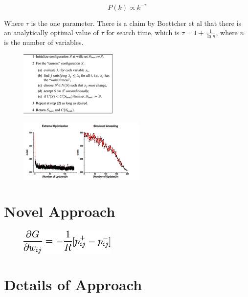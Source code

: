 \documentclass[12pt]{article}
\begin{document}
$$P(k) \propto k^{-\tau}$$

Where $\tau$ is the one parameter. There is a claim by Boettcher et al that there is an analytically optimal value of $\tau$ for search time, which is $\tau = 1 + \frac{1}{\ln n}$, where $n$ is the number of variables.%

  \begin{figure}
    \includegraphics{eo_alg}
  \end{figure}
  \begin{figure}
    \includegraphics{boettcher}
  \end{figure}
  
\section{Novel Approach}


  \begin{figure}
    \includegraphics{rbm_eq}
  \end{figure}


\section{Details of Approach}
\end{document}
